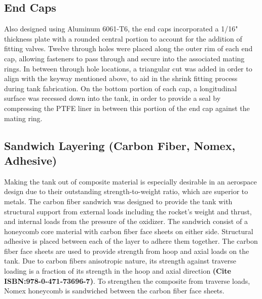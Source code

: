 \subsection{End Caps}


Also designed using Aluminum 6061-T6, the end caps incorporated a 1/16" thickness plate with a rounded central portion to account for the addition of fitting valves.  Twelve through holes were placed along the outer rim of each end cap, allowing fasteners to pass through and secure into the associated mating rings.  In between through hole locations, a triangular cut was added in order to align with the keyway mentioned above, to aid in the shrink fitting process during tank fabrication.  On the bottom portion of each cap, a longitudinal surface was recessed down into the tank, in order to provide a seal by compressing the PTFE liner in between this portion of the end cap against the mating ring.

\subsection{Sandwich Layering (Carbon Fiber, Nomex, Adhesive)}


Making the tank out of composite material is especially desirable in an aerospace design due to their outstanding strength-to-weight ratio, which are superior to metals. The carbon fiber sandwich was designed to provide the tank with structural support from external loads including the rocket’s weight and thrust, and internal loads from the pressure of the oxidizer. 
The sandwich consist of a honeycomb core material with carbon fiber face sheets on either side. Structural adhesive is placed between each of the layer to adhere them together. The carbon fiber face sheets are used to provide strength from hoop and axial loads on the tank. Due to carbon fibers anisotropic nature, its strength against traverse loading is a fraction of its strength in the hoop and axial direction \textbf{(Cite ISBN:978-0-471-73696-7)}. To strengthen the composite from traverse loads, Nomex honeycomb is sandwiched between the carbon fiber face sheets. 


